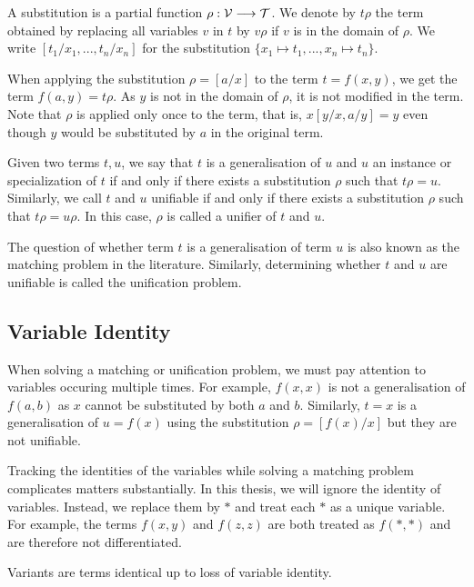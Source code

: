 \begin{defn}
  A substitution is a partial function $\rho : \mathcal{V} \longrightarrow \mathcal{T}$. We denote by $t \rho$ the term obtained by replacing all variables $v$ in $t$ by $v \rho$ if $v$ is in the domain of $\rho$. We write $[t_{1}/x_{1},...,t_{n}/x_{n}]$ for the substitution $\{x_{1} \mapsto t_{1}, ..., x_{n} \mapsto t_{n}\}$.
\end{defn}

When applying the substitution $\rho = [a/x]$ to the term $t = f(x,y)$, we get the term $f(a,y) = t \rho$. As $y$ is not in the domain of $\rho$, it is not modified in the term. Note that $\rho$ is applied only once to the term, that is, $x [y/x, a/y] = y$ even though $y$ would be substituted by $a$ in the original term.

\begin{defn}
Given two terms $t, u$, we say that $t$ is a generalisation of $u$ and $u$ an instance or specialization of $t$ if and only if there exists a substitution $\rho$ such that $t \rho = u$. Similarly, we call $t$ and $u$ unifiable if and only if there exists a substitution $\rho$ such that $t \rho = u \rho$. In this case, $\rho$ is called a unifier of $t$ and $u$.
\end{defn}

The question of whether term $t$ is a generalisation of term $u$ is also known as the matching problem in the literature. Similarly, determining whether $t$ and $u$ are unifiable is called the unification problem. \cite{mccune_experiments_1992}

\subsection{Variable Identity}\label{var_id}
When solving a matching or unification problem, we must pay attention to variables occuring multiple times. For example, $f(x,x)$ is not a generalisation of $f(a,b)$ as $x$ cannot be substituted by both $a$ and $b$. Similarly, $t = x$ is a generalisation of $u = f(x)$ using the substitution $\rho = [f(x)/x]$ but they are not unifiable.

Tracking the identities of the variables while solving a matching problem complicates matters substantially. In this thesis, we will ignore the identity of variables. Instead, we replace them by $*$ and treat each $*$ as a unique variable. For example, the terms $f(x,y)$ and $f(z,z)$ are both treated as $f(*,*)$ and are therefore not differentiated.

\begin{defn}
  Variants are terms identical up to loss of variable identity.
\end{defn}


